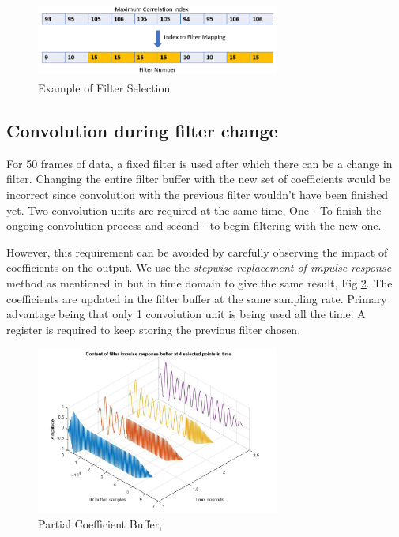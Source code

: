 \documentclass[conference]{IEEEtran}
\begin{document}
\begin{figure}
    \centering
    \includegraphics[width = 8cm, height = 2.5cm]{index_2_filter.png}
    \caption{Example of Filter Selection}
    \label{fig:past10}
\end{figure}

\subsection{Convolution during filter change}

For 50 frames of data, a fixed filter is used after which there can be a change in filter. Changing the entire filter buffer with the new set of coefficients would be incorrect since convolution with the previous filter wouldn't have been finished yet. Two convolution units are required at the same time, One - To finish the ongoing convolution process and second - to begin filtering with the new one.

However, this requirement can be avoided by carefully observing the impact of coefficients on the output. We use the \textit{stepwise replacement of impulse response} method as mentioned in \cite{live} but in time domain to give the same result, Fig \ref{fig:coeffupdate}. The coefficients are updated in the filter buffer at the same sampling rate. Primary advantage being that only 1 convolution unit is being used all the time. A register is required to keep storing the previous filter chosen. 

\begin{figure}
    \centering
    \includegraphics[width = 8cm]{coeffupdate.png}
    \caption{Partial Coefficient Buffer, \cite{live}}
    \label{fig:coeffupdate}
\end{figure}
\end{document}
